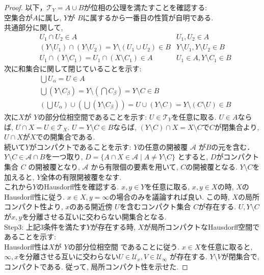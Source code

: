 \documentclass[dvipdfmx]{jbook}
\theoremstyle{remark}
\theoremstyle{plain}
\begin{document}
\begin{proof}
	 以下，$\mathcal{T}_Y = A \cup B$が位相の公理を満たすことを確認する:\\
	 空集合が$A$に属し,  $Y$が $B$に属するから一番目の性質が自明である.\\
	 共通部分に関して,
	 \begin{align*}
		& U_1 \cap U_2 \in A & U_1 , U_2 \in A \\
		& \left( Y \setminus U_1 \right) \cap \left( Y \setminus U_2 \right) = Y \setminus \left(U_1 \cup U_2  \right) \in B &Y\setminus U_1,Y\setminus U_2 \in B \\
		&U_1 \cap  \left( Y \setminus C_1 \right) = U_1  \cap \left( X \setminus C_1 \right) \in A & U_1 \in A , Y\setminus C_1 \in B 
	 \end{align*}
	 次に和集合に関して閉じていることを示す:
	 \begin{align*}
		& \bigcup U _{\alpha} = U \in A \\
		& \bigcup \left( Y \setminus C _{\beta} \right)  = Y \setminus \left( \bigcap C_{\beta}  \right) = Y \setminus C \in B  \\
		& \left( \bigcup U_{\alpha}  \right) \cup \left( \bigcup \left( Y \setminus C_{\beta} \right)   \right)  = U \cup (Y \setminus C) = Y \setminus \left( C \setminus U \right) \in B  
	 \end{align*}
	次に$X$が $Y$の部分位相空間であることを示す:  $U \in \mathcal{T}_Y$を任意に取る.
	$U \in  A$ならば, $U \cap X = U \in \mathcal{T}_X $. $U = Y \setminus C \in B$ならば, $\left( Y\setminus C \right) \cap X = X \setminus C $で$C$が閉集合より,  $U \cap X$が$X$での開集合である. \\
	続いて$Y$がコンパクトであることを示す:
	$Y$の任意の開被覆 $\mathcal{A}$ が$B$の元を含む． 
	$Y \setminus C \in \mathcal{A} \cap B$を一つ取り,  
	$D =\{ A \cap X \in \mathcal{A}  \mid A \neq Y \setminus C\} $ とすると, 
	$D$がコンパクト集合 $C$ の開被覆となり, 
	$\mathcal{A}$ から有限個の要素を用いて, $C$の開被覆となる.  
	$Y \setminus C$を加えると, $Y$全体の有限開被覆をなす.\\
	これから$Y$のHausdorff性を確認する.  $x, y \in Y$を任意に取る, $x, y \in X$の時, $X$のHausdorff性に従う.  $x \in X , y = \infty$の場合のみを議論すれば良い. この時, $X$の局所コンパクト性より,  $x$のある開近傍 $U$を含むコンパクト集合 $C$が存在する.  $U , Y \setminus C$が$x,y$を分離させる互いに交わらない開集合となる.\\
	Step3: 上記3条件を満たす$Y$が存在する時,  $X$が局所コンパクトなHausdorff空間であることを示す:\\
	Hausdorff性は$X$が $Y$の部分位相空間 であることに従う. $x \in X$を任意に取ると, $\infty ,x$を分離させる互いに交わらない$U \in \mathcal{U}_x, V \in \mathcal{U}_{\infty}$ が存在する. $Y \setminus V$が閉集合で, コンパクトである. 従って, 局所コンパクト性を示せた.
	

\end{proof}
\end{document}
